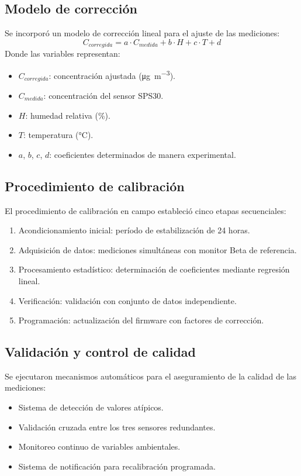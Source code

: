 \subsection{Modelo de corrección}
Se incorporó un modelo de corrección lineal para el ajuste de las mediciones:
\begin{equation}
C_{corregida} = a \cdot C_{medida} + b \cdot H + c \cdot T + d
\end{equation}
Donde las variables representan:
\begin{itemize}
	\item $C_{corregida}$: concentración ajustada (\si{\micro\gram\per\cubic\meter}).
	\item $C_{medida}$: concentración del sensor SPS30.
	\item $H$: humedad relativa (\%).
	\item $T$: temperatura (\si{\celsius}).
	\item $a$, $b$, $c$, $d$: coeficientes determinados  de manera experimental.
\end{itemize}

\subsection{Procedimiento de calibración}
El procedimiento de calibración en campo estableció cinco etapas secuenciales:
\begin{enumerate}
	\item Acondicionamiento inicial: período de estabilización de 24 horas.
	\item Adquisición de datos: mediciones simultáneas con monitor Beta de referencia.
	\item Procesamiento estadístico: determinación de coeficientes mediante regresión lineal.
	\item Verificación: validación con conjunto de datos independiente.
	\item Programación: actualización del firmware con factores de corrección.
\end{enumerate}


\subsection{Validación y control de calidad}
Se ejecutaron mecanismos automáticos para el aseguramiento de la calidad de las mediciones:
\begin{itemize}
	\item Sistema de detección de valores atípicos.
	\item Validación cruzada entre los tres sensores redundantes.
	\item Monitoreo continuo de variables ambientales.
	\item Sistema de notificación para recalibración programada.
\end{itemize}

